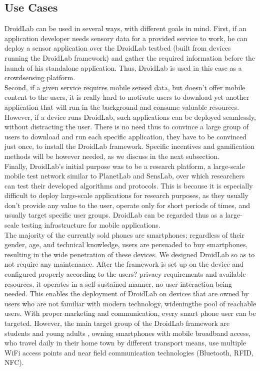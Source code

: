 \documentclass[conference,letterpaper]{IEEEtran}
\begin{document}
\subsection{Use Cases}
DroidLab can be used in several ways, with different goals in mind. First, if an application developer needs sensory data for a provided service to work, he can deploy a sensor application over the DroidLab testbed (built from devices running the DroidLab framework) and gather the required information before the launch of his standalone application. Thus, DroidLab is used in this case as a crowdsensing platform.\\
\indent Second, if a given service requires mobile sensed data, but doesn't offer mobile content to the users, it is really hard to motivate users to download yet another application that will run in the background and consume valuable resources. However, if a device runs DroidLab, such applications can be deployed seamlessly, without distracting the user. There is no need thus to convince a large group of users to download and run each specific application, they have to be convinced just once, to install the DroidLab framework. Specific incentives and gamification methods will be however needed, as we discuss in the next subsection. \\
\indent Finally, DroidLab's initial purpose was to be a research platform, a large-scale mobile test network similar to PlanetLab and SensLab, over which researchers can test their developed algorithms and protocols. This is because it is especially difficult to deploy large-scale applications for research purposes, as they usually don't provide any value to the user, operate only for short periods of times, and usually target specific user groups. DroidLab can be regarded thus as a large-scale testing infrastructure for mobile applications. \\
\indent The majority of the currently sold phones are smartphones; regardless of their gender, age, and technical knowledge, users are persuaded to buy smartphones, resulting in the wide penetration of these devices. We designed DroidLab so as to not require any maintenance. After the framework is set up on the device and configured properly according to the users? privacy requirements and available resources, it operates in a self-sustained manner, no user interaction being needed. This enables the deployment of DroidLab on devices that are owned by users who are not familiar with modern technology, wideningthe pool of reachable users. With proper marketing and communication, every smart phone user can be targeted. However, the main target group of the DroidLab framework are students and young adults , owning smartphones with mobile broadband access, who travel daily in their home town by different transport means, use multiple WiFi access points and near field communication technologies (Bluetooth, RFID, NFC).
\end{document}
